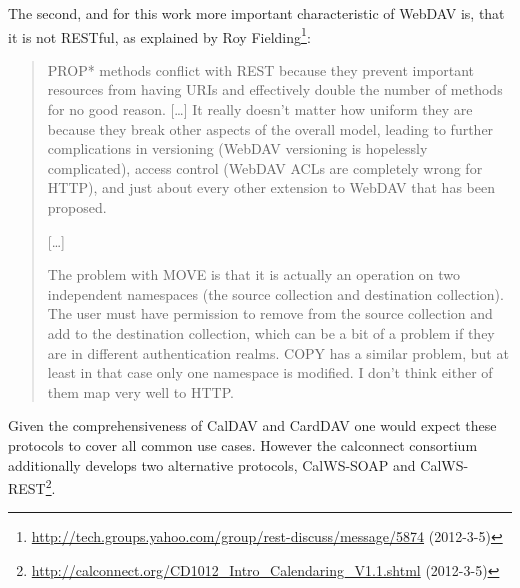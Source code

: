\documentclass[11pt,a4paper,headsepline,twoside]{scrartcl}		%
\newcommand{\citeurl}[2]{\url{#1} (#2)}
\begin{document}
The second, and for this work more important characteristic of WebDAV is, that it
is not RESTful, as explained by Roy
Fielding\footnote{\citeurl{http://tech.groups.yahoo.com/group/rest-discuss/message/5874}{2012-3-5}}:

\begin{quotation}
  PROP* methods conflict with REST because they prevent important resources from
  having URIs and effectively double the number of methods for no good
  reason. [\ldots] It really doesn't matter how uniform they are because they
  break other aspects of the overall model, leading to further complications in
  versioning (WebDAV versioning is hopelessly complicated), access control
  (WebDAV ACLs are completely wrong for HTTP), and just about every other
  extension to WebDAV that has been proposed.

  [\ldots]

  The problem with MOVE is that it is actually an operation on two independent
  namespaces (the source collection and destination collection). The user must
  have permission to remove from the source collection and add to the
  destination collection, which can be a bit of a problem if they are in
  different authentication realms. COPY has a similar problem, but at least in
  that case only one namespace is modified. I don't think either of them map
  very well to HTTP.
\end{quotation}


Given the comprehensiveness of CalDAV and CardDAV one would expect these
protocols to cover all common use cases. However the calconnect consortium
additionally develops two alternative protocols, CalWS-SOAP and
CalWS-REST\footnote{\citeurl{http://calconnect.org/CD1012_Intro_Calendaring_V1.1.shtml}{2012-3-5}}.
\end{document}
